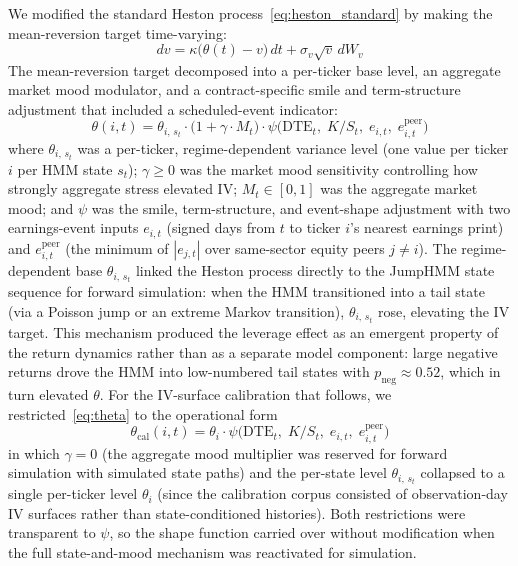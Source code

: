 We modified the standard Heston process~\eqref{eq:heston_standard} by making the mean-reversion target time-varying:
\begin{equation}\label{eq:heston_modified}
    dv = \kappa\bigl(\theta(t) - v\bigr)\,dt + \sigma_v \sqrt{v}\,dW_v
\end{equation}
The mean-reversion target decomposed into a per-ticker base level, an aggregate market mood modulator, and a contract-specific smile and term-structure adjustment that included a scheduled-event indicator:
\begin{equation}\label{eq:theta}
    \theta(i, t) = \theta_{i,\,s_t} \cdot \bigl(1 + \gamma \cdot M_t\bigr) \cdot \psi\bigl(\mathrm{DTE}_t,\; K/S_t,\; e_{i,t},\; e^{\text{peer}}_{i,t}\bigr)
\end{equation}
where $\theta_{i,\,s_t}$ was a per-ticker, regime-dependent variance level (one value per ticker $i$ per HMM state $s_t$); $\gamma \geq 0$ was the market mood sensitivity controlling how strongly aggregate stress elevated IV; $M_t \in [0, 1]$ was the aggregate market mood; and $\psi$ was the smile, term-structure, and event-shape adjustment with two earnings-event inputs $e_{i,t}$ (signed days from $t$ to ticker $i$'s nearest earnings print) and $e^{\text{peer}}_{i,t}$ (the minimum of $|e_{j,t}|$ over same-sector equity peers $j \neq i$). The regime-dependent base $\theta_{i,\,s_t}$ linked the Heston process directly to the JumpHMM state sequence for forward simulation: when the HMM transitioned into a tail state (via a Poisson jump or an extreme Markov transition), $\theta_{i,\,s_t}$ rose, elevating the IV target. This mechanism produced the leverage effect as an emergent property of the return dynamics rather than as a separate model component: large negative returns drove the HMM into low-numbered tail states with $p_{\text{neg}} \approx 0.52$, which in turn elevated $\theta$. For the IV-surface calibration that follows, we restricted~\eqref{eq:theta} to the operational form
\begin{equation}\label{eq:theta_calibration}
    \theta_{\text{cal}}(i, t) = \theta_i \cdot \psi\bigl(\mathrm{DTE}_t,\; K/S_t,\; e_{i,t},\; e^{\text{peer}}_{i,t}\bigr)
\end{equation}
in which $\gamma = 0$ (the aggregate mood multiplier was reserved for forward simulation with simulated state paths) and the per-state level $\theta_{i,\,s_t}$ collapsed to a single per-ticker level $\theta_i$ (since the calibration corpus consisted of observation-day IV surfaces rather than state-conditioned histories). Both restrictions were transparent to $\psi$, so the shape function carried over without modification when the full state-and-mood mechanism was reactivated for simulation.

